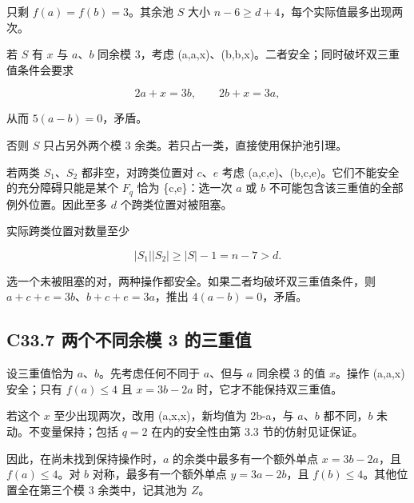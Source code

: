 {只剩} {\ensuremath{f(a)=f(b)=3}。其余池} {\ensuremath{S}} {大小} {\ensuremath{n-6\ge d+4}，每个实际值最多出现两次。}

{若} {\ensuremath{S}} {有} {\ensuremath{x}} {与} {\ensuremath{a}、\ensuremath{b}} {同余模} {3，考虑} {(a,a,x)、(b,b,x)。二者安全；同时破坏双三重值条件会要求}

\[
2a+x=3b,\qquad 2b+x=3a,
\]

{从而} {\ensuremath{5(a-b)=0}，矛盾。}

{否则} {\ensuremath{S}} {只占另外两个模} {3} {余类。若只占一类，直接使用保护池引理。}

{若两类} {\ensuremath{S_{1}}、\ensuremath{S_{2}}} {都非空，对跨类位置对} {\ensuremath{c}、\ensuremath{e}} {考虑} {(a,c,e)、(b,c,e)。它们不能安全的充分障碍只能是某个} {\ensuremath{F_{q}}} {恰为} {\{c,e\}：选一次} {\ensuremath{a}} {或} {\ensuremath{b}} {不可能包含该三重值的全部例外位置。因此至多} {\ensuremath{d}} {个跨类位置对被阻塞。}

{实际跨类位置对数量至少}

\[
|S_1||S_2|\ge |S|-1=n-7>d.
\]

{选一个未被阻塞的对，两种操作都安全。如果二者均破坏双三重值条件，则} {\ensuremath{a+c+e=3b}、\ensuremath{b+c+e=3a}，推出} {\ensuremath{4(a-b)=0}，矛盾。}

\subsection*{\texorpdfstring{{C33.7} {两个不同余模} {3} {的三重值}}{C33.7 两个不同余模 3 的三重值}}\label{C33-h221}

{设三重值恰为} {\ensuremath{a}、\ensuremath{b}。先考虑任何不同于} {\ensuremath{a}、但与} {\ensuremath{a}} {同余模} {3} {的值} {\ensuremath{x}。操作} {(a,a,x)} {安全；只有} {\ensuremath{f(a)\le 4}} {且} {\ensuremath{x=3b-2a}} {时，它才不能保持双三重值。}

{若这个} {\ensuremath{x}} {至少出现两次，改用} {(a,x,x)，新均值为} {2b-a，与} {\ensuremath{a}、\ensuremath{b}} {都不同，\ensuremath{b}} {未动。不变量保持；包括} {\ensuremath{q=2}} {在内的安全性由第} {3.3} {节的仿射见证保证。}

{因此，在尚未找到保持操作时，\ensuremath{a}} {的余类中最多有一个额外单点} {\ensuremath{x=3b-2a}，且} {\ensuremath{f(a)\le 4}。对} {\ensuremath{b}} {对称，最多有一个额外单点} {\ensuremath{y=3a-2b}，且} {\ensuremath{f(b)\le 4}。其他位置全在第三个模} {3} {余类中，记其池为} {\ensuremath{Z}。}

